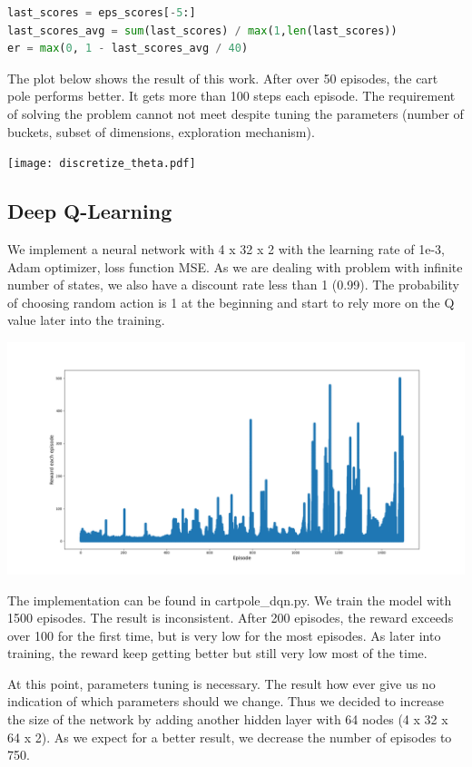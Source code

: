 \documentclass[11pt]{article}
\begin{document}
\begin{lstlisting}[language=python, caption=distance functions]
last_scores = eps_scores[-5:]
last_scores_avg = sum(last_scores) / max(1,len(last_scores))
er = max(0, 1 - last_scores_avg / 40)
\end{lstlisting}

The plot below shows the result of this work. After over 50 episodes, the cart pole performs better. It gets more than 100 steps each episode. The requirement of solving the problem cannot not meet despite tuning the parameters (number of buckets, subset of dimensions, exploration mechanism).

\texttt{[image: discretize\_theta.pdf]}

\subsection{Deep Q-Learning}

We implement a neural network with 4 x 32 x 2 with the learning rate of 1e-3, Adam optimizer, loss function MSE. As we are dealing with problem with infinite number of states, we also have a discount rate less than 1 (0.99). The probability of choosing random action is 1 at the beginning and start to rely more on the Q value later into the training.

\includegraphics[width=\textwidth,height=\textheight,keepaspectratio]{figures/dqn.png}

The implementation can be found in cartpole\_dqn.py. We train the model with 1500 episodes. The result is inconsistent. After 200 episodes, the reward exceeds over 100 for the first time, but is very low for the most episodes. As later into training, the reward keep getting better but still very low most of the time.

At this point, parameters tuning is necessary. The result how ever give us no indication of which parameters should we change. Thus we decided to increase the size of the network by adding another hidden layer with 64 nodes (4 x 32 x 64 x 2). As we expect for a better result, we decrease the number of episodes to 750.
\end{document}
